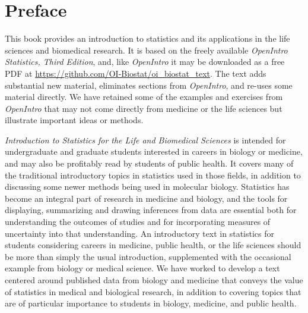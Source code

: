 
\chapter*{Preface}



This book provides an introduction to statistics and its applications in the life sciences and biomedical research.  It is based on the freely available \textsl{OpenIntro Statistics, Third Edition}, and, like \textsl{OpenIntro} it may be downloaded as a free PDF at \url{https://github.com/OI-Biostat/oi_biostat_text}.  The text adds substantial new material, eliminates sections from \textsl{OpenIntro}, and re-uses some material directly. We have retained some of the examples and exercises from \textsl{OpenIntro} that may not come directly from medicine or the life sciences but illustrate important ideas or methods. 

\textsl{Introduction to Statistics for the Life and Biomedical Sciences} is intended for undergraduate and graduate students interested in careers in biology or medicine, and may also be profitably read by students of public health.  It covers many of the traditional introductory topics in statistics used in those fields, in addition to discussing some newer methods being used in molecular biology. Statistics has become an integral part of research in medicine and biology, and the tools for displaying, summarizing and drawing inferences from data are essential both for understanding the outcomes of studies and for incorporating measures of uncertainty into that understanding.  An introductory text in statistics for students considering careers in medicine, public health, or the life sciences should be more than simply the usual introduction, supplemented with the occasional example from biology or medical science. We have worked to develop a text centered around published data from biology and medicine that conveys the value of statistics in medical and biological research, in addition to covering topics that are of particular importance to students in biology, medicine, and public health.

\begin{comment}
Along with the value of careful, robust analyses of experimental and observational data, it should convey some of the excitement of discovery that emerges from the interplay of science with data collection and analysis. We hope we have conveyed some of that excitement here.
\end{comment} 

